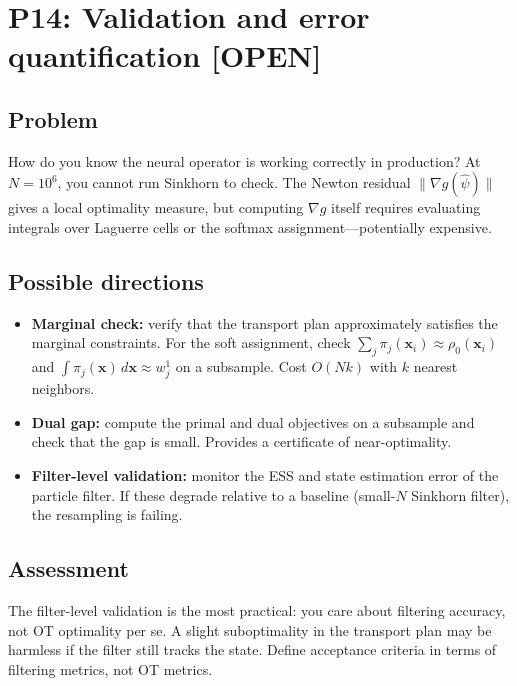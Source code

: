 \documentclass[11pt]{article}
\newcommand{\bx}{\mathbf{x}}
\newcommand{\statusopen}{\textcolor{open}{\textbf{[OPEN]}}}
\begin{document}
\section{P14: Validation and error quantification \statusopen}

\subsection*{Problem}
How do you know the neural operator is working correctly in production? At $N = 10^6$, you cannot run Sinkhorn to check. The Newton residual $\|\nabla g(\hat\psi)\|$ gives a local optimality measure, but computing $\nabla g$ itself requires evaluating integrals over Laguerre cells or the softmax assignment---potentially expensive.

\subsection*{Possible directions}
\begin{itemize}[nosep,leftmargin=1.5em]
    \item \textbf{Marginal check:} verify that the transport plan approximately satisfies the marginal constraints. For the soft assignment, check $\sum_j \pi_j(\bx_i) \approx \rho_0(\bx_i)$ and $\int \pi_j(\bx)\,d\bx \approx w^1_j$ on a subsample. Cost $O(Nk)$ with $k$ nearest neighbors.
    \item \textbf{Dual gap:} compute the primal and dual objectives on a subsample and check that the gap is small. Provides a certificate of near-optimality.
    \item \textbf{Filter-level validation:} monitor the ESS and state estimation error of the particle filter. If these degrade relative to a baseline (small-$N$ Sinkhorn filter), the resampling is failing.
\end{itemize}

\subsection*{Assessment}
The filter-level validation is the most practical: you care about filtering accuracy, not OT optimality per se. A slight suboptimality in the transport plan may be harmless if the filter still tracks the state. Define acceptance criteria in terms of filtering metrics, not OT metrics.

\end{document}
